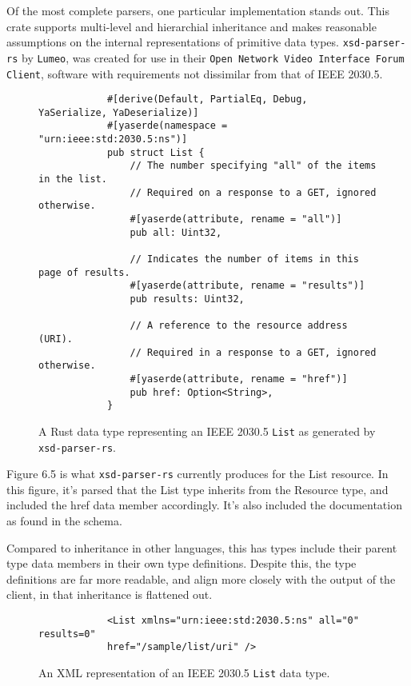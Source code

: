 Of the most complete parsers, one particular implementation stands out. This crate supports multi-level and hierarchial inheritance and makes reasonable assumptions on the internal representations of primitive data types.
\texttt{xsd-parser-rs} by \texttt{Lumeo}, was created for use in their \texttt{Open Network Video Interface Forum Client}, software with requirements not dissimilar from that of IEEE 2030.5. \cite[]{xsdparserrs}

\begin{figure}[H]
    \begin{center}
        \begin{lstlisting}
            #[derive(Default, PartialEq, Debug, YaSerialize, YaDeserialize)]
            #[yaserde(namespace = "urn:ieee:std:2030.5:ns")]
            pub struct List {
                // The number specifying "all" of the items in the list. 
                // Required on a response to a GET, ignored otherwise.
                #[yaserde(attribute, rename = "all")]
                pub all: Uint32,
            
                // Indicates the number of items in this page of results.
                #[yaserde(attribute, rename = "results")]
                pub results: Uint32,
            
                // A reference to the resource address (URI). 
                // Required in a response to a GET, ignored otherwise.
                #[yaserde(attribute, rename = "href")]
                pub href: Option<String>,
            }
        \end{lstlisting}
        \label{fig:listauto}
        \caption{A Rust data type representing an IEEE 2030.5 \texttt{List} as generated by \texttt{xsd-parser-rs}.}
    \end{center}
\end{figure}

Figure 6.5 is what \texttt{xsd-parser-rs} currently produces for the List resource. In this figure, it's parsed that the List type inherits from the Resource type, and included the href data member accordingly. It's also included the documentation as found in the schema.

Compared to inheritance in other languages, this has types include their parent type data members in their own type definitions.
Despite this, the type definitions are far more readable, and align more closely with the output of the client, in that inheritance is flattened out.


\begin{figure}[H]
    \begin{center}
        \begin{lstlisting}
            <List xmlns="urn:ieee:std:2030.5:ns" all="0" results=0" 
            href="/sample/list/uri" />
        \end{lstlisting}
        \label{fig:listxml}
        \caption{An XML representation of an IEEE 2030.5 \texttt{List} data type.}
    \end{center}
\end{figure}

